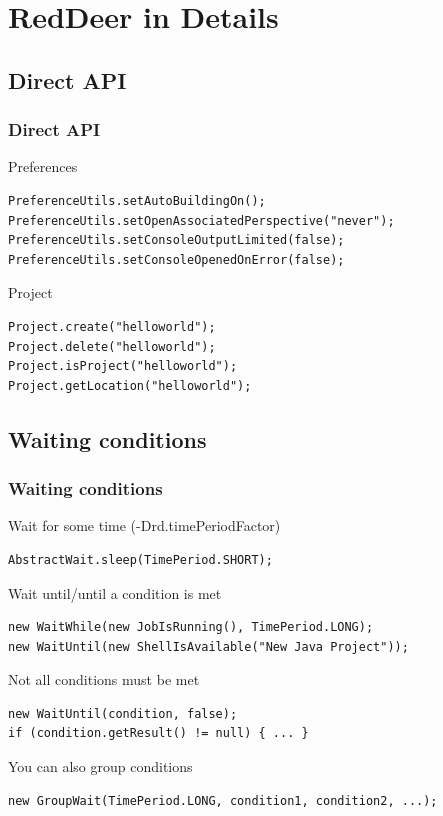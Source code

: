 \documentclass{beamer}
\begin{document}
\section{RedDeer in Details}

\subsection{Direct API}
\begin{frame}[fragile]
\frametitle{Direct API}
Preferences
\begin{lstlisting}
PreferenceUtils.setAutoBuildingOn();
PreferenceUtils.setOpenAssociatedPerspective("never");
PreferenceUtils.setConsoleOutputLimited(false);
PreferenceUtils.setConsoleOpenedOnError(false);
\end{lstlisting}
\vspace{0.5cm}
\pause
Project
\begin{lstlisting}
Project.create("helloworld");
Project.delete("helloworld");
Project.isProject("helloworld");
Project.getLocation("helloworld");
\end{lstlisting}
\end{frame}

\subsection{Waiting conditions}
\begin{frame}[fragile]
\frametitle{Waiting conditions}
Wait for some time (-Drd.timePeriodFactor)
\begin{lstlisting}
AbstractWait.sleep(TimePeriod.SHORT);
\end{lstlisting}
\pause
Wait until/until a condition is met
\begin{lstlisting}
new WaitWhile(new JobIsRunning(), TimePeriod.LONG);
new WaitUntil(new ShellIsAvailable("New Java Project"));
\end{lstlisting}
\pause
Not all conditions must be met
\begin{lstlisting}
new WaitUntil(condition, false);
if (condition.getResult() != null) { ... }
\end{lstlisting}
\pause
You can also group conditions
\begin{lstlisting}
new GroupWait(TimePeriod.LONG, condition1, condition2, ...);
\end{lstlisting}
\end{frame}
\end{document}
